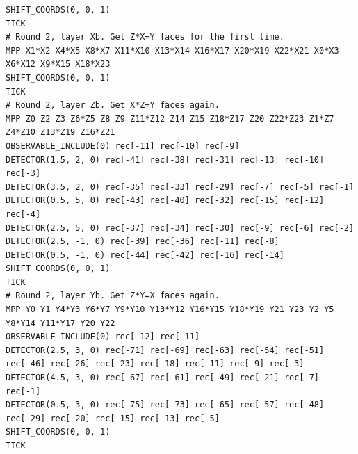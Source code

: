 \documentclass[onecolumn,unpublished,a4paper]{quantumarticle}
\theoremstyle{definition}
\theoremstyle{definition}
\theoremstyle{definition}
\begin{document}
\begin{lstlisting}[style=stimcircuit]
SHIFT_COORDS(0, 0, 1)
TICK
# Round 2, layer Xb. Get Z*X=Y faces for the first time.
MPP X1*X2 X4*X5 X8*X7 X11*X10 X13*X14 X16*X17 X20*X19 X22*X21 X0*X3 X6*X12 X9*X15 X18*X23
SHIFT_COORDS(0, 0, 1)
TICK
# Round 2, layer Zb. Get X*Z=Y faces again.
MPP Z0 Z2 Z3 Z6*Z5 Z8 Z9 Z11*Z12 Z14 Z15 Z18*Z17 Z20 Z22*Z23 Z1*Z7 Z4*Z10 Z13*Z19 Z16*Z21
OBSERVABLE_INCLUDE(0) rec[-11] rec[-10] rec[-9]
DETECTOR(1.5, 2, 0) rec[-41] rec[-38] rec[-31] rec[-13] rec[-10] rec[-3]
DETECTOR(3.5, 2, 0) rec[-35] rec[-33] rec[-29] rec[-7] rec[-5] rec[-1]
DETECTOR(0.5, 5, 0) rec[-43] rec[-40] rec[-32] rec[-15] rec[-12] rec[-4]
DETECTOR(2.5, 5, 0) rec[-37] rec[-34] rec[-30] rec[-9] rec[-6] rec[-2]
DETECTOR(2.5, -1, 0) rec[-39] rec[-36] rec[-11] rec[-8]
DETECTOR(0.5, -1, 0) rec[-44] rec[-42] rec[-16] rec[-14]
SHIFT_COORDS(0, 0, 1)
TICK
# Round 2, layer Yb. Get Z*Y=X faces again.
MPP Y0 Y1 Y4*Y3 Y6*Y7 Y9*Y10 Y13*Y12 Y16*Y15 Y18*Y19 Y21 Y23 Y2 Y5 Y8*Y14 Y11*Y17 Y20 Y22
OBSERVABLE_INCLUDE(0) rec[-12] rec[-11]
DETECTOR(2.5, 3, 0) rec[-71] rec[-69] rec[-63] rec[-54] rec[-51] rec[-46] rec[-26] rec[-23] rec[-18] rec[-11] rec[-9] rec[-3]
DETECTOR(4.5, 3, 0) rec[-67] rec[-61] rec[-49] rec[-21] rec[-7] rec[-1]
DETECTOR(0.5, 3, 0) rec[-75] rec[-73] rec[-65] rec[-57] rec[-48] rec[-29] rec[-20] rec[-15] rec[-13] rec[-5]
SHIFT_COORDS(0, 0, 1)
TICK


\end{lstlisting}
\end{document}
